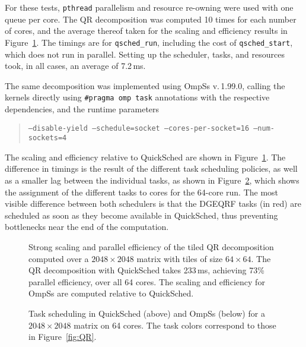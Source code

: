 \documentclass[preprint]{elsarticle}
\newcommand{\fig}[1]
    {Figure~\ref{fig:#1}}
\begin{document}
For these tests, {\tt pthread} parallelism and resource re-owning
were used with one queue per core.
The QR decomposition was computed 10 times for each number of
cores, and the average thereof taken for the scaling and
efficiency results in \fig{QRResults}.
The timings are for {\tt qsched\_run}, including the cost of
{\tt qsched\_start}, which does not run in parallel.
Setting up the scheduler, tasks, and resources took, in all
cases, an average of 7.2\,ms.

The same decomposition was implemented using OmpSs v.\,1.99.0,
calling the kernels directly using {\tt \#pragma omp task}
annotations with the respective dependencies, and
the runtime parameters
\begin{quote}
    \tt --disable-yield --schedule=socket --cores-per-socket=16 --num-sockets=4
\end{quote}
\noindent The scaling and efficiency relative to QuickSched are 
shown in \fig{QRResults}.
The difference in timings is the result of the different
task scheduling policies, as well as a smaller lag between the
individual tasks, as shown in \fig{QRTasks},
which shows the assignment of the different tasks to cores for the
64-core run.
The most visible difference between both schedulers is that
the DGEQRF tasks (in red) are scheduled as soon as they
become available in QuickSched, thus preventing bottlenecks
near the end of the computation.

\begin{figure}
    \centerline{}
    \caption{Strong scaling and parallel efficiency of the tiled QR decomposition
        computed over a $2048\times 2048$ matrix with tiles of size
        $64\times 64$.
        The QR decomposition with QuickSched takes 233\,ms,
        achieving 73\% parallel efficiency, over all 64 cores.
        The scaling and efficiency for OmpSs are computed relative to QuickSched.
        }
    \label{fig:QRResults}
\end{figure}

\begin{figure}
    \centerline{}
    \centerline{}
    \caption{Task scheduling in QuickSched (above) and OmpSs (below)
        for a $2048\times 2048$ matrix on 64 cores.
        The task colors correspond to those in \fig{QR}.}
    \label{fig:QRTasks}
\end{figure}
\end{document}
